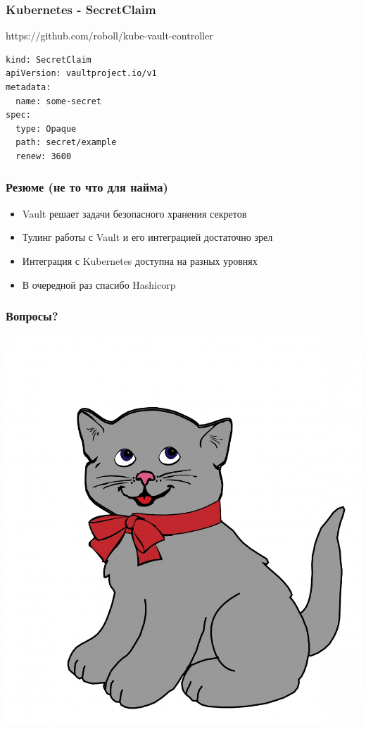 \documentclass[mathserif,serif]{beamer}
\begin{document}
\begin{frame}[fragile]
	\frametitle{Kubernetes - SecretClaim}
	https://github.com/roboll/kube-vault-controller
	\begin{verbatim}
kind: SecretClaim
apiVersion: vaultproject.io/v1
metadata:
  name: some-secret
spec:
  type: Opaque
  path: secret/example
  renew: 3600
	\end{verbatim}
\end{frame}

\begin{frame}
	\frametitle{Резюме (не то что для найма)}
	\begin{itemize}
		\item{Vault решает задачи безопасного хранения секретов}
		\item{Тулинг работы с Vault и его интеграцией достаточно зрел}
		\item{Интеграция с Kubernetes доступна на разных уровнях}
		\item{В очередной раз спасибо Hashicorp}
	\end{itemize}
\end{frame}

\begin{frame}
	\frametitle{Вопросы?}
	\includegraphics[width=\linewidth]{kitten.jpg}
\end{frame}
\end{document}

